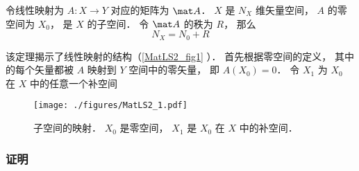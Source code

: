 

\begin{theorem}{}
令线性映射为 $A:X\to Y$ 对应的矩阵为 $\mat A$． $X$ 是 $N_X$ 维矢量空间， $A$ 的零空间为 $X_0$， 是 $X$ 的子空间． 令 $\mat A$ 的秩为 $R$， 那么
\begin{equation}
N_X = N_0 + R
\end{equation}
\end{theorem}

该定理揭示了线性映射的结构（\autoref{MatLS2_fig1} ）． 首先根据零空间的定义， 其中的每个矢量都被 $A$ 映射到 $Y$ 空间中的零矢量， 即 $A(X_0) = 0$． 令 $X_1$ 为 $X_0$ 在 $X$ 中的任意一个补空间
\begin{figure}[ht]
\centering
\texttt{[image: ./figures/MatLS2\_1.pdf]}
\caption{子空间的映射． $X_0$ 是零空间， $X_1$ 是 $X_0$ 在 $X$ 中的补空间．} \label{MatLS2_fig1}
\end{figure}


\subsubsection{证明}


